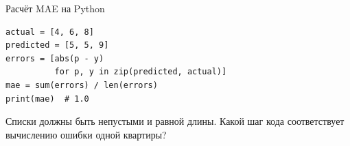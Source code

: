 \begin{frame}[fragile]{Расчёт MAE на Python}
\begin{verbatim}
actual = [4, 6, 8]
predicted = [5, 5, 9]
errors = [abs(p - y)
          for p, y in zip(predicted, actual)]
mae = sum(errors) / len(errors)
print(mae)  # 1.0
\end{verbatim}
  \medskip
  Списки должны быть непустыми и равной длины.
  Какой шаг кода соответствует вычислению ошибки одной квартиры?
\end{frame}
